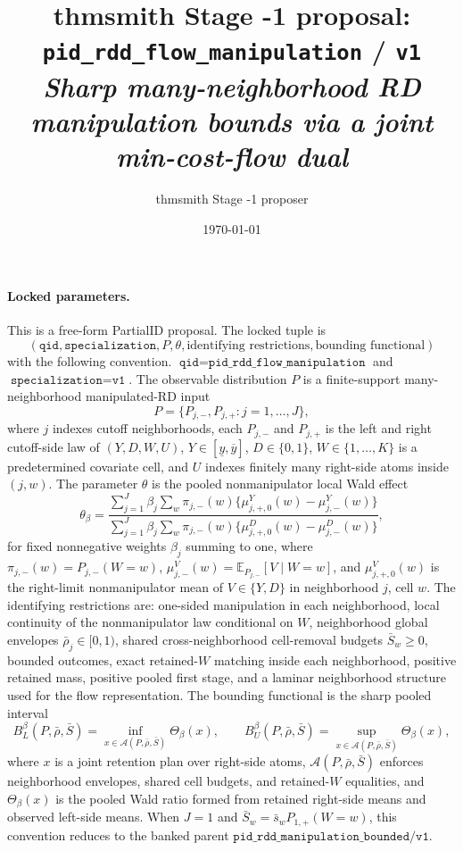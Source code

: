 \documentclass[11pt]{article}
\title{thmsmith Stage -1 proposal: \texttt{pid\_rdd\_flow\_manipulation} / \texttt{v1}%
  \\ \large\textit{Sharp many-neighborhood RD manipulation bounds via a joint min-cost-flow dual}}
\author{thmsmith Stage -1 proposer}
\date{\today}
\newcommand{\E}{\mathbb{E}}
\theoremstyle{definition}
\theoremstyle{plain}
\theoremstyle{remark}
\begin{document}
\maketitle


\paragraph{Locked parameters.}
This is a free-form PartialID proposal. The locked tuple is
\[
  (\texttt{qid}, \texttt{specialization}, P, \theta, \text{identifying restrictions},
  \text{bounding functional})
\]
with the following convention. \(\texttt{qid}=\texttt{pid\_rdd\_flow\_manipulation}\) and
\(\texttt{specialization}=\texttt{v1}\). The observable distribution \(P\) is a finite-support
many-neighborhood manipulated-RD input
\[
  P=\bigl\{P_{j,-},P_{j,+}: j=1,\ldots,J\bigr\},
\]
where \(j\) indexes cutoff neighborhoods, each \(P_{j,-}\) and \(P_{j,+}\) is the left and right
cutoff-side law of \((Y,D,W,U)\), \(Y\in[\underline y,\overline y]\), \(D\in\{0,1\}\),
\(W\in\{1,\ldots,K\}\) is a predetermined covariate cell, and \(U\) indexes finitely many
right-side atoms inside \((j,w)\). The parameter \(\theta\) is the pooled nonmanipulator local
Wald effect
\[
  \theta_\beta =
  \frac{\sum_{j=1}^J \beta_j
    \sum_w \pi_{j,-}(w)\{\mu^Y_{j,+,0}(w)-\mu^Y_{j,-}(w)\}}
       {\sum_{j=1}^J \beta_j
    \sum_w \pi_{j,-}(w)\{\mu^D_{j,+,0}(w)-\mu^D_{j,-}(w)\}},
\]
for fixed nonnegative weights \(\beta_j\) summing to one, where
\(\pi_{j,-}(w)=P_{j,-}(W=w)\), \(\mu^V_{j,-}(w)=\E_{P_{j,-}}[V\mid W=w]\), and
\(\mu^V_{j,+,0}(w)\) is the right-limit nonmanipulator mean of \(V\in\{Y,D\}\) in neighborhood
\(j\), cell \(w\). The identifying restrictions are: one-sided manipulation in each
neighborhood, local continuity of the nonmanipulator law conditional on \(W\), neighborhood
global envelopes \(\bar\rho_j\in[0,1)\), shared cross-neighborhood cell-removal budgets
\(\bar S_w\ge 0\), bounded outcomes, exact retained-\(W\) matching inside each neighborhood,
positive retained mass, positive pooled first stage, and a laminar neighborhood structure used
for the flow representation. The bounding functional is the sharp pooled interval
\[
  B_L^\beta(P,\bar\rho,\bar S)=\inf_{x\in\mathcal A(P,\bar\rho,\bar S)} \Theta_\beta(x),
  \qquad
  B_U^\beta(P,\bar\rho,\bar S)=\sup_{x\in\mathcal A(P,\bar\rho,\bar S)} \Theta_\beta(x),
\]
where \(x\) is a joint retention plan over right-side atoms, \(\mathcal A(P,\bar\rho,\bar S)\)
enforces neighborhood envelopes, shared cell budgets, and retained-\(W\) equalities, and
\(\Theta_\beta(x)\) is the pooled Wald ratio formed from retained right-side means and observed
left-side means. When \(J=1\) and \(\bar S_w=\bar s_w P_{1,+}(W=w)\), this convention reduces to
the banked parent \(\texttt{pid\_rdd\_manipulation\_bounded}/\texttt{v1}\).
\end{document}
